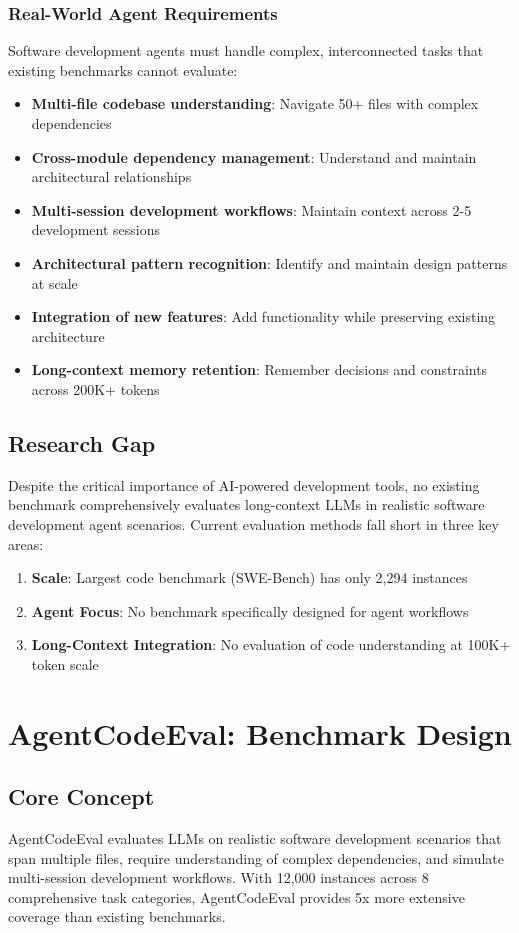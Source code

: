 \documentclass{article}
\begin{document}
\subsubsection{Real-World Agent Requirements}
Software development agents must handle complex, interconnected tasks that existing benchmarks cannot evaluate:
\begin{itemize}
    \item \textbf{Multi-file codebase understanding}: Navigate 50+ files with complex dependencies
    \item \textbf{Cross-module dependency management}: Understand and maintain architectural relationships
    \item \textbf{Multi-session development workflows}: Maintain context across 2-5 development sessions
    \item \textbf{Architectural pattern recognition}: Identify and maintain design patterns at scale
    \item \textbf{Integration of new features}: Add functionality while preserving existing architecture
    \item \textbf{Long-context memory retention}: Remember decisions and constraints across 200K+ tokens
\end{itemize}

\subsection{Research Gap}
Despite the critical importance of AI-powered development tools, no existing benchmark comprehensively evaluates long-context LLMs in realistic software development agent scenarios. Current evaluation methods fall short in three key areas:

\begin{enumerate}
    \item \textbf{Scale}: Largest code benchmark (SWE-Bench) has only 2,294 instances
    \item \textbf{Agent Focus}: No benchmark specifically designed for agent workflows
    \item \textbf{Long-Context Integration}: No evaluation of code understanding at 100K+ token scale
\end{enumerate}

\section{AgentCodeEval: Benchmark Design}

\subsection{Core Concept}
AgentCodeEval evaluates LLMs on realistic software development scenarios that span multiple files, require understanding of complex dependencies, and simulate multi-session development workflows. With 12,000 instances across 8 comprehensive task categories, AgentCodeEval provides 5x more extensive coverage than existing benchmarks.
\end{document}

